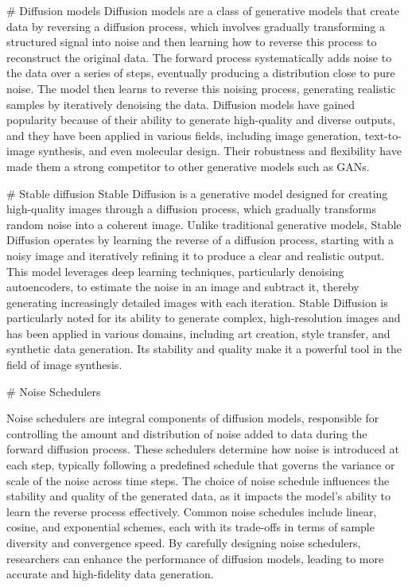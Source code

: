# Diffusion models
Diffusion models are a class of generative models that create data by reversing a diffusion process, which involves gradually transforming a structured signal into noise and then learning how to reverse this process to reconstruct the original data. The forward process systematically adds noise to the data over a series of steps, eventually producing a distribution close to pure noise. The model then learns to reverse this noising process, generating realistic samples by iteratively denoising the data. Diffusion models have gained popularity because of their ability to generate high-quality and diverse outputs, and they have been applied in various fields, including image generation, text-to-image synthesis, and even molecular design. Their robustness and flexibility have made them a strong competitor to other generative models such as GANs.

# Stable diffusion
Stable Diffusion is a generative model designed for creating high-quality images through a diffusion process, which gradually transforms random noise into a coherent image. Unlike traditional generative models, Stable Diffusion operates by learning the reverse of a diffusion process, starting with a noisy image and iteratively refining it to produce a clear and realistic output. This model leverages deep learning techniques, particularly denoising autoencoders, to estimate the noise in an image and subtract it, thereby generating increasingly detailed images with each iteration. Stable Diffusion is particularly noted for its ability to generate complex, high-resolution images and has been applied in various domains, including art creation, style transfer, and synthetic data generation. Its stability and quality make it a powerful tool in the field of image synthesis.

# Noise Schedulers

Noise schedulers are integral components of diffusion models, responsible for controlling the amount and distribution of noise added to data during the forward diffusion process. These schedulers determine how noise is introduced at each step, typically following a predefined schedule that governs the variance or scale of the noise across time steps. The choice of noise schedule influences the stability and quality of the generated data, as it impacts the model's ability to learn the reverse process effectively. Common noise schedules include linear, cosine, and exponential schemes, each with its trade-offs in terms of sample diversity and convergence speed. By carefully designing noise schedulers, researchers can enhance the performance of diffusion models, leading to more accurate and high-fidelity data generation.

